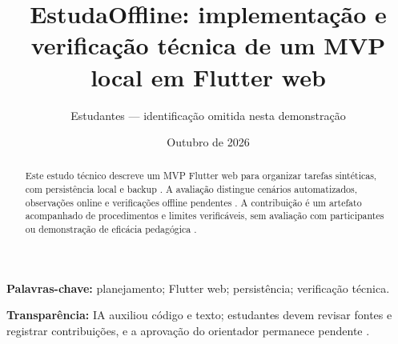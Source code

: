 \documentclass[12pt,a4paper]{article}
\title{EstudaOffline: implementação e verificação técnica de um MVP local em Flutter web}
\author{Estudantes — identificação omitida nesta demonstração}
\date{Outubro de 2026}
\begin{document}
\sloppy\maketitle
\begin{abstract}Este estudo técnico descreve um MVP Flutter web para organizar tarefas sintéticas, com persistência local e backup . A avaliação distingue cenários automatizados, observações online e verificações offline pendentes . A contribuição é um artefato acompanhado de procedimentos e limites verificáveis, sem avaliação com participantes ou demonstração de eficácia pedagógica .\end{abstract}
\noindent\textbf{Palavras-chave:} planejamento; Flutter web; persistência; verificação técnica.
\par\medskip\noindent\textbf{Transparência:} IA auxiliou código e texto; estudantes devem revisar fontes e registrar contribuições, e a aprovação do orientador permanece pendente .

\clearpage
\begingroup
\linespread{1}\selectfont
\setlength{\bibsep}{6pt}
\renewcommand{\refname}{Referências}

\endgroup
\end{document}

